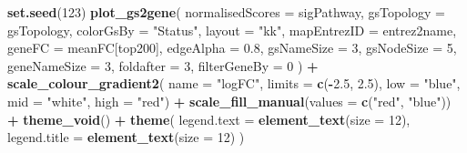 \documentclass[9pt,a4paper,]{extarticle}
\newenvironment{Shaded}{\begin{snugshade}}{\end{snugshade}}
\newcommand{\AttributeTok}[1]{\textcolor[rgb]{0.13,0.29,0.53}{#1}}
\newcommand{\DecValTok}[1]{\textcolor[rgb]{0.00,0.00,0.81}{#1}}
\newcommand{\FloatTok}[1]{\textcolor[rgb]{0.00,0.00,0.81}{#1}}
\newcommand{\FunctionTok}[1]{\textcolor[rgb]{0.13,0.29,0.53}{\textbf{#1}}}
\newcommand{\NormalTok}[1]{#1}
\newcommand{\SpecialCharTok}[1]{\textcolor[rgb]{0.81,0.36,0.00}{\textbf{#1}}}
\newcommand{\StringTok}[1]{\textcolor[rgb]{0.31,0.60,0.02}{#1}}
\begin{document}
\begin{Shaded}
\begin{Highlighting}[]
\FunctionTok{set.seed}\NormalTok{(}\DecValTok{123}\NormalTok{)}
\FunctionTok{plot\_gs2gene}\NormalTok{(}
    \AttributeTok{normalisedScores =}\NormalTok{ sigPathway, }
    \AttributeTok{gsTopology =}\NormalTok{ gsTopology, }
    \AttributeTok{colorGsBy =} \StringTok{"Status"}\NormalTok{, }
    \AttributeTok{layout =} \StringTok{"kk"}\NormalTok{,}
    \AttributeTok{mapEntrezID =}\NormalTok{ entrez2name, }
    \AttributeTok{geneFC =}\NormalTok{ meanFC[top200], }
    \AttributeTok{edgeAlpha =} \FloatTok{0.8}\NormalTok{, }
    \AttributeTok{gsNameSize =} \DecValTok{3}\NormalTok{, }
    \AttributeTok{gsNodeSize =} \DecValTok{5}\NormalTok{,}
    \AttributeTok{geneNameSize =} \DecValTok{3}\NormalTok{, }
    \AttributeTok{foldafter =} \DecValTok{3}\NormalTok{, }
    \AttributeTok{filterGeneBy =} \DecValTok{0}
\NormalTok{) }\SpecialCharTok{+}
    \FunctionTok{scale\_colour\_gradient2}\NormalTok{(}
        \AttributeTok{name =} \StringTok{"logFC"}\NormalTok{, }
        \AttributeTok{limits =} \FunctionTok{c}\NormalTok{(}\SpecialCharTok{{-}}\FloatTok{2.5}\NormalTok{, }\FloatTok{2.5}\NormalTok{), }
        \AttributeTok{low =} \StringTok{"blue"}\NormalTok{,}
        \AttributeTok{mid =} \StringTok{"white"}\NormalTok{,}
        \AttributeTok{high =} \StringTok{"red"}\NormalTok{) }\SpecialCharTok{+}
    \FunctionTok{scale\_fill\_manual}\NormalTok{(}\AttributeTok{values =} \FunctionTok{c}\NormalTok{(}\StringTok{"red"}\NormalTok{, }\StringTok{"blue"}\NormalTok{)) }\SpecialCharTok{+}
    \FunctionTok{theme\_void}\NormalTok{() }\SpecialCharTok{+}
    \FunctionTok{theme}\NormalTok{(}
        \AttributeTok{legend.text =} \FunctionTok{element\_text}\NormalTok{(}\AttributeTok{size =} \DecValTok{12}\NormalTok{),}
        \AttributeTok{legend.title =} \FunctionTok{element\_text}\NormalTok{(}\AttributeTok{size =} \DecValTok{12}\NormalTok{)}
\NormalTok{    )}
\end{Highlighting}
\end{Shaded}
\end{document}
